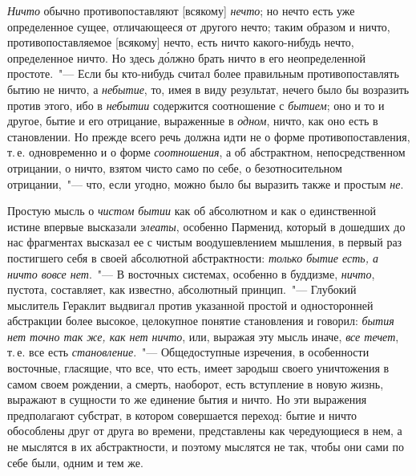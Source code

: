 \emph{Ничто} обычно противопоставляют [всякому] \emph{нечто}; но
нечто есть уже определенное сущее, отличающееся от
другого нечто; таким образом и ничто, противопоставляемое
[всякому] нечто, есть ничто какого-нибудь нечто,
определенное ничто. Но здесь д\'олжно брать ничто в его
неопределенной простоте.~"--- Если бы кто-нибудь считал
более правильным противопоставлять бытию не ничто,
а \emph{небытие}, то, имея в виду результат, нечего было бы
возразить против этого, ибо в \emph{небытии} содержится соотношение
с \emph{бытием}; оно и то и другое, бытие и его отрицание,
выраженные в \emph{одном}, ничто, как оно есть в становлении.
Но прежде всего речь должна идти не о форме
противопоставления, т.\,е. одновременно и о форме \emph{соотношения},
а об абстрактном, непосредственном отрицании,
о ничто, взятом чисто само по себе, о безотносительном
отрицании,~"--- что, если угодно, можно было бы выразить
также и простым \emph{не}.

Простую мысль о \emph{чистом бытии} как об абсолютном
и как о единственной истине впервые высказали \emph{элеаты},
особенно Парменид, который в дошедших до нас фрагментах
высказал ее с чистым воодушевлением мышления,
в первый раз постигшего себя в своей абсолютной абстрактности:
\emph{только бытие есть, а ничто вовсе нет}.~"---
В восточных системах, особенно в буддизме, \emph{ничто}, пустота,
составляет, как известно, абсолютный принцип.~"---
Глубокий мыслитель Гераклит выдвигал против указанной
простой и односторонней абстракции более высокое,
целокупное понятие становления и говорил: \emph{бытия нет
точно так же, как нет ничто}, или, выражая эту мысль
иначе, \emph{все течет}, т.\,е. все есть \emph{становление}.~"--- Общедоступные
изречения, в особенности восточные, гласящие,
что все, что есть, имеет зародыш своего уничтожения
в самом своем рождении, а смерть, наоборот, есть вступление
в новую жизнь, выражают в сущности то же единение
бытия и ничто. Но эти выражения предполагают
субстрат, в котором совершается переход: бытие и ничто
обособлены друг от друга во времени, представлены как
чередующиеся в нем, а не мыслятся в их абстрактности,
и поэтому мыслятся не так, чтобы они сами по себе были,
одним и тем же.

